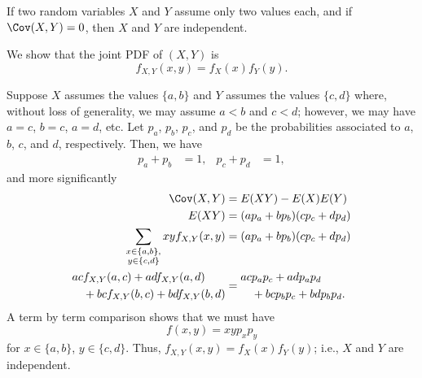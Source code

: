 \begin{problem}[Handout 15, \# 20]
  If two random variables \(X\) and \(Y\) assume only two values
  each, and if \(\Cov(X,Y)=0\), then \(X\) and \(Y\) are
  independent.
\end{problem}
\begin{solution}
  We show that the joint PDF of \((X,Y)\) is
  \[
    f_{X,Y}(x,y)=f_X(x)f_Y(y).
  \]

  Suppose \(X\) assumes the values \(\{a,b\}\) and \(Y\) assumes the values
  \(\{c,d\}\) where, without loss of generality, we may assume \(a<b\) and
  \(c<d\); however, we may have \(a=c\), \(b=c\), \(a=d\), etc. Let
  \(p_a\), \(p_b\), \(p_c\), and \(p_d\) be the probabilities associated to
  \(a\), \(b\), \(c\), and \(d\), respectively. Then, we have
  \[
    \begin{aligned}
      p_a+p_b&=1,&p_c+p_d&=1,
    \end{aligned}
  \]
  and more significantly
  \begin{align*}
    \Cov(X,Y)
    &=E(XY)-E(X)E(Y)\\
    E(XY)&=(ap_a+bp_b)(cp_c+dp_d)\\
    \sum_{\substack{x\in\{a,b\},\\ y\in\{c,d\}}}xy f_{X,Y}(x,y)
    &=(ap_a+bp_b)(cp_c+dp_d)\\
    \begin{aligned}
      ac&f_{X,Y}(a,c)+adf_{X,Y}(a,d)\\&+bcf_{X,Y}(b,c)+bdf_{X,Y}(b,d)
    \end{aligned}
    &=
      \begin{aligned}
        ac&p_ap_c+adp_ap_d\\&+bcp_bp_c+bdp_bp_d.
      \end{aligned}
  \end{align*}
  A term by term comparison shows that we must have
  \[
    f(x,y)=xyp_xp_y
  \]
  for \(x\in\{a,b\}\), \(y\in\{c,d\}\). Thus,
  \(f_{X,Y}(x,y)=f_X(x)f_Y(y)\); i.e., \(X\) and \(Y\) are independent.
\end{solution}

